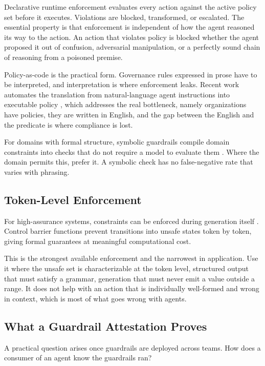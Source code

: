 Declarative runtime enforcement evaluates every action against the active policy
set before it executes. Violations are blocked, transformed, or escalated. The
essential property is that enforcement is independent of how the agent reasoned
its way to the action. An action that violates policy is blocked whether the
agent proposed it out of confusion, adversarial manipulation, or a perfectly sound
chain of reasoning from a poisoned premise.

Policy-as-code is the practical form. Governance rules expressed in prose have to
be interpreted, and interpretation is where enforcement leaks. Recent work
automates the translation from natural-language agent instructions into executable
policy \cite{autoformal2026, policyprompt2026}, which addresses the real
bottleneck, namely organizations have policies, they are written in English, and the gap
between the English and the predicate is where compliance is lost.

For domains with formal structure, symbolic guardrails compile domain constraints
into checks that do not require a model to evaluate them
\cite{symbolicguard2026}. Where the domain permits this, prefer it. A symbolic
check has no false-negative rate that varies with phrasing.

\subsection{Token-Level Enforcement}

For high-assurance systems, constraints can be enforced during generation itself
\cite{callm2025}. Control barrier functions prevent transitions into unsafe
states token by token, giving formal guarantees at meaningful computational cost.

This is the strongest available enforcement and the narrowest in application. Use
it where the unsafe set is characterizable at the token level, structured
output that must satisfy a grammar, generation that must never emit a value
outside a range. It does not help with an action that is individually well-formed
and wrong in context, which is most of what goes wrong with agents.

\subsection{What a Guardrail Attestation Proves}

A practical question arises once guardrails are deployed across teams. How does a
consumer of an agent know the guardrails ran?

